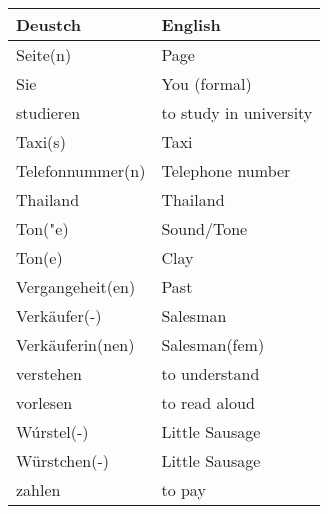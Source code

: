 \documentclass{article}
\renewcommand{\arraystretch}{1}
\begin{document}
\newpage

\begin{minipage}{0.48\textwidth}
    \centering
    \renewcommand{\arraystretch}{1.5}
    \begin{tabular}{|>{\raggedright\arraybackslash}p{3.5cm}|>{\raggedright\arraybackslash}p{3.5cm}|}
        \hline
        \rowcolor{gray!20} \textbf{Deustch} & \textbf{English} \\
        \hline
        Seite(n) & Page \\\hline
        Sie & You (formal) \\\hline
        studieren & to study in university \\\hline
        Taxi(s) & Taxi \\\hline
        Telefonnummer(n) & Telephone number \\\hline
        Thailand & Thailand \\\hline
        Ton("e) & Sound/Tone \\\hline
        Ton(e) & Clay \\\hline
        Vergangeheit(en) & Past \\\hline
        Verkäufer(-) & Salesman \\\hline
        Verkäuferin(nen) & Salesman(fem) \\\hline
        verstehen & to understand \\\hline
        vorlesen & to read aloud \\\hline
        Wúrstel(-) & Little Sausage \\\hline
        Würstchen(-) & Little Sausage \\\hline
        zahlen & to pay \\\hline
    \end{tabular}
\end{minipage}%
\end{document}

